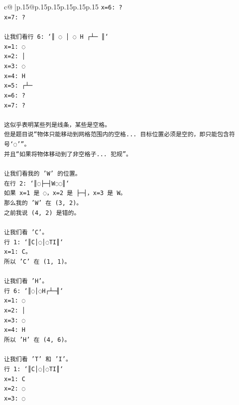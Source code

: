 \documentclass{article}
\begin{document}
{\begin{supertabular}{c@{$\;$}|p{.15\linewidth}@{}p{.15\linewidth}p{.15\linewidth}p{.15\linewidth}p{.15\linewidth}p{.15\linewidth}}
{{{\texttt{x=6: ?} \\
\texttt{x=7: ?} \\
\\ 
\texttt{让我们看行 6: `║ ◌ │ ◌ H ┌┴─ ║`} \\
\texttt{x=1: ◌} \\
\texttt{x=2: │} \\
\texttt{x=3: ◌} \\
\texttt{x=4: H} \\
\texttt{x=5: ┌┴─} \\
\texttt{x=6: ?} \\
\texttt{x=7: ?} \\
\\ 
\texttt{这似乎表明某些列是线条，某些是空格。} \\
\texttt{但是题目说“物体只能移动到网格范围内的空格... 目标位置必须是空的，即只能包含符号‘◌’”。} \\
\texttt{并且“如果将物体移动到了非空格子... 犯规”。} \\
\\ 
\texttt{让我们看我的 'W' 的位置。} \\
\texttt{在行 2: `║◌├─┤W◌◌║`} \\
\texttt{如果 x=1 是 ◌，x=2 是 ├─┤，x=3 是 W。} \\
\texttt{那么我的 'W' 在 (3, 2)。} \\
\texttt{之前我说 (4, 2) 是错的。} \\
\\ 
\texttt{让我们看 'C'。} \\
\texttt{行 1: `║C│◌│◌TI║`} \\
\texttt{x=1: C。} \\
\texttt{所以 'C' 在 (1, 1)。} \\
\\ 
\texttt{让我们看 'H'。} \\
\texttt{行 6: `║◌│◌H┌┴─╢`} \\
\texttt{x=1: ◌} \\
\texttt{x=2: │} \\
\texttt{x=3: ◌} \\
\texttt{x=4: H} \\
\texttt{所以 'H' 在 (4, 6)。} \\
\\ 
\texttt{让我们看 'T' 和 'I'。} \\
\texttt{行 1: `║C│◌│◌TI║`} \\
\texttt{x=1: C} \\
\texttt{x=2: ◌} \\
\texttt{x=3: ◌} \\
}}}
\end{supertabular}}
\end{document}
